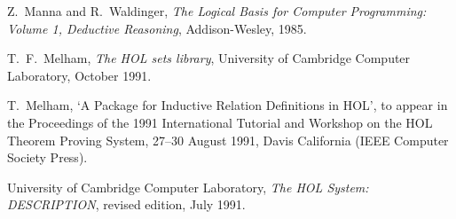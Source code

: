 \begin{thebibliography}{99}

Z.\ Manna and R.\ Waldinger,
{\it The Logical Basis for Computer Programming:
Volume 1, Deductive Reasoning},
Addison-Wesley, 1985.

T.\ F.\ Melham,
{\it The HOL sets library},
University of Cambridge Computer Laboratory,
October 1991.

T.\ Melham,
`A Package for Inductive Relation Definitions in HOL',
to appear in the Proceedings of the 1991 International Tutorial
and Workshop on the HOL Theorem Proving System, 27--30 August 1991,
Davis California (IEEE Computer Society Press).

University of Cambridge Computer Laboratory,
{\it The HOL System: DESCRIPTION}, revised edition, July 1991.

\end{thebibliography}


